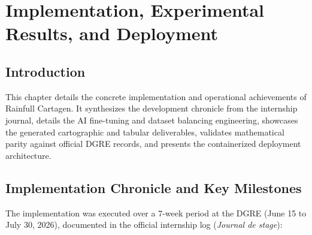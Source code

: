 \documentclass[12pt,a4paper]{report}
\begin{document}
\newpage

\chapter{Implementation, Experimental Results, and Deployment}

\section{Introduction}

This chapter details the concrete implementation and operational achievements of Rainfull Cartagen. It synthesizes the development chronicle from the internship journal, details the AI fine-tuning and dataset balancing engineering, showcases the generated cartographic and tabular deliverables, validates mathematical parity against official DGRE records, and presents the containerized deployment architecture.

\section{Implementation Chronicle and Key Milestones}

The implementation was executed over a 7-week period at the DGRE (June 15 to July 30, 2026), documented in the official internship log (\textit{Journal de stage}):
\end{document}
